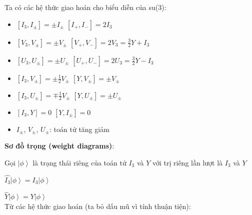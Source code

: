 \documentclass{report}
\begin{document}
	Ta có các hệ thức giao hoán cho biểu diễn của su(3):
	
	\begin{itemize}
		\item \( \left[ I_{3}, I_{\pm} \right] = \pm I_{\pm} \) \hspace*{0.9cm} \( \left[ I_{+}, I_{-} \right] = 2 I_{3} \)
		\item \( \left[ V_{3}, V_{\pm} \right] = \pm V_{\pm} \) \hspace*{0.8cm} \( \left[ V_{+}, V_{-} \right] = 2 V_{3} = \frac{3}{2} Y + I_{3} \)
		\item \( \left[ U_{3}, U_{\pm} \right] = \pm U_{\pm} \) \hspace*{0.7cm} \( \left[ U_{+}, U_{-} \right] = 2 U_{3} = \frac{3}{2} Y - I_{3} \)
		\item \( \left[ I_{3}, V_{\pm} \right] = \pm \frac{1}{2} V_{\pm} \) \hspace*{0.6cm} \( \left[ Y, V_{\pm} \right] = \pm V_{\pm} \)
		\item \( \left[ I_{3}, U_{\pm} \right] = \mp \frac{1}{2} V_{\pm} \) \hspace*{0.6cm} \( \left[ Y, U_{\pm} \right] = \pm U_{\pm} \)
		\item \( \left[ I_{3}, Y \right] = 0 \) \hspace*{1.6cm} \( \left[ Y, I_{\pm} \right] = 0 \)
		\item \( I_{\pm} \), \( V_{\pm} \), \( U_{\pm} \): toán tử tăng giảm
	\end{itemize}
	
	\textbf{Sơ đồ trọng (weight diagrams)}: 
	
	Gọi \( \left| \phi \right\rangle \) là trạng thái riêng của toán tử \( I_{3} \) và \( Y \) với trị riêng lần lượt là \( I_{3} \) và \( Y \)
	
	\( \widehat{I_{3}} \left| \phi \right\rangle = I_{3} \left| \phi \right\rangle \)
	
	\( \widehat{Y} \left| \phi \right\rangle = Y \left| \phi \right\rangle \)\\
	
	Từ các hệ thức giao hoán (ta bỏ dấu mũ vì tính thuận tiện):
	
\end{document}
